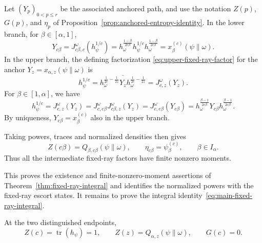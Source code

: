 \documentclass[12pt]{article}
\numberwithin{equation}{section}
\theoremstyle{definition}
\theoremstyle{remark}
\newcommand{\?}{\overset{?}{=}}
\DeclareMathOperator{\tr}{tr}
\begin{document}
Let $(Y_p)_{0<p\leq r}$ be the associated anchored path, and use the
notation $Z(p)$, $G(p)$, and $\eta_p$ of Proposition~\ref{prop:anchored-entropy-identity}.  In the lower branch, for $\beta\in[\alpha,1]$,
\[
    Y_{c\beta} = J_{c\beta,c}^{\omega}(h_\psi^{1/c}) = h_\omega^{\frac{1-\beta}{2c\beta}} h_\psi^{1/c}h_\omega^{\frac{1-\beta}{2c\beta}} = x_\beta^{(c)}(\psi\|\omega).
\]
In the upper branch, 
the defining factorization \eqref{eq:upper-fixed-ray-factor} for the anchor $Y_z=x_{\alpha,z}(\psi\|\omega)$ is
\begin{equation}
  h_\psi^{1/c}
  =
  \overline{
  h_\omega^{\frac1{2c}-\frac1{2z}}
  Y_z
  h_\omega^{\frac1{2c}-\frac1{2z}}}
  =
  J_{c,z}^\omega(Y_z).
  \label{eq:upper-fixed-ray-anchor-factorization}
\end{equation}
For $\beta\in[1,\alpha]$, we have
\begin{equation}
    h_\psi^{1/c}
    =
    J_{c,z}^\omega(Y_z)
    = 
    J_{c,c\beta}^\omega J_{c\beta,z}^\omega(Y_z)
    = 
    J_{c,c\beta}^\omega(Y_{c\beta})
    =
    h_\omega^{\frac{\beta-1}{2c\beta}}Y_{c\beta}h_\omega^{\frac{\beta-1}{2c\beta}}.
\end{equation}
By uniqueness, $Y_{c\beta}=x_\beta^{(c)}$ also in the upper branch.

Taking powers, traces and normalized densities then gives
\begin{equation}
  Z(c\beta)
  =
  Q_{\beta,c\beta}(\psi\|\omega),
  \qquad
  \eta_{c\beta}
  =
  \psi_\beta^{(c)},
  \qquad \beta\in I_\alpha.
  \label{eq:anchored-fixed-ray-identification}
\end{equation}
Thus all the intermediate fixed-ray factors have finite nonzero moments.

This proves the existence and finite-nonzero-moment assertions of
Theorem~\ref{thm:fixed-ray-integral} and identifies 
the normalized powers with the fixed-ray
escort states.  It remains to prove the integral identity~\eqref{eq:main-fixed-ray-integral}.

At the two distinguished endpoints,
\begin{equation}
  Z(c)=\tr(h_\psi)=1,
  \qquad
  Z(z)=Q_{\alpha,z}(\psi\|\omega),
  \qquad
  G(c)=0.
  \label{eq:fixed-ray-anchor-endpoints}
\end{equation}
\end{document}
